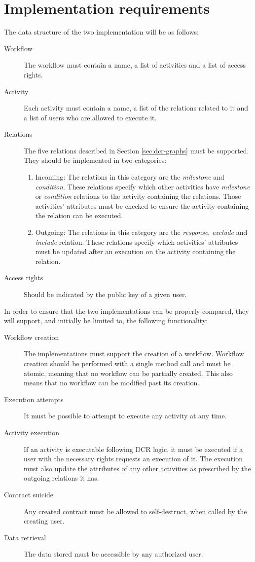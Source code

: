 \documentclass{article}
\begin{document}
	\section{Implementation requirements}
	\label{sec:implementation-requirements}
	The data structure of the two implementation will be as follows:

	\begin{description}
		\item[Workflow] The workflow must contain a name, a list of activities and a list of access rights.
		\item[Activity] Each activity must contain a name, a list of the relations related to it and a list of users who are allowed to execute it.
		\item[Relations] The five relations described in Section \ref{sec:dcr-graphs} must be supported. They should be implemented in two categories:
			\begin{enumerate}
				\item Incoming: The relations in this category are the \emph{milestone} and \emph{condition}. These relations specify which other activities have \emph{milestone} or \emph{condition} relations to the activity containing the relations. Those activities' attributes must be checked to ensure the activity containing the relation can be executed.
				\item Outgoing: The relations in this category are the \emph{response}, \emph{exclude} and \emph{include} relation. These relations specify which activities' attributes must be updated after an execution on the activity containing the relation. 
			\end{enumerate}
		\item[Access rights] Should be indicated by the public key of a given user.
	\end{description}

	In order to ensure that the two implementations can be properly compared, they will support, and initially be limited to, the following functionality: 
	
	\begin{description}
		\item[Workflow creation] The implementations must support the creation of a workflow. Workflow creation should be performed with a single method call and must be atomic, meaning that no workflow can be partially created. This also means that no workflow can be modified past its creation.
		\item[Execution attempts] It must be possible to attempt to execute any activity at any time.
		\item[Activity execution] If an activity is executable following DCR logic, it must be executed if a user with the necessary rights requests an execution of it. The execution must also update the attributes of any other activities as prescribed by the outgoing relations it has.
		\item[Contract suicide] Any created contract must be allowed to self-destruct, when called by the creating user.
		\item[Data retrieval] The data stored must be accessible by any authorized user.
	\end{description}
\end{document}
